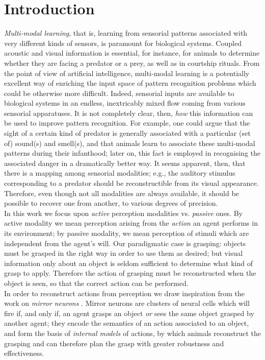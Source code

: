 \section{Introduction}
\label{sec:intro}

\emph{Multi-modal learning}, that is, learning from sensorial patterns associated with very different kinds of sensors, is paramount for biological systems. Coupled acoustic and visual information is essential, for instance, for animals to determine whether they are facing a predator or a prey, as well as in courtship rituals. From the point of view of artificial intelligence, multi-modal learning is a potentially excellent way of enriching the input space of pattern recognition problems which could be otherwise more difficult.
Indeed, sensorial inputs are available to biological systems in an endless, inextricably mixed flow coming from various sensorial apparatuses. It is not completely clear, then, \emph{how} this information can be used to improve pattern recognition. For example, one could argue that the sight of a certain kind of predator is generally associated with a particular (set of) sound(s) and smell(s), and that animals learn to associate these multi-modal patterns during their infanthood; later on, this fact is employed in recognising the associated danger in a dramatically better way. It seems apparent, then, that there is a mapping among sensorial modalities; e.g., the auditory stimulus corresponding to a predator should be reconstructible from its visual appearance. Therefore, even though not all modalities are always available, it should be possible to recover one from another, to various degrees of precision.\\
In this work we focus upon \emph{active} perception modalities vs. \emph{passive} ones. By active modality we mean perception arising from the \emph{action} an agent performs in its environment; by passive modality, we mean perception of stimuli which are independent from the agent's will. Our paradigmatic case is grasping: objects must be grasped in the right way in order to use them as desired; but visual information only about an object is seldom sufficient to determine what kind of grasp to apply. Therefore the action of grasping must be reconstructed when the object is seen, so that the correct action can be performed.\\
In order to reconstruct actions from perception we draw inspiration from the work on \emph{mirror neurons} \cite{gallese,rizz}. Mirror neurons are clusters of neural cells which will fire if, and only if, an agent grasps an object \emph{or} sees the same object grasped by another agent; they encode the semantics of an action associated to an object, and form the basis of \emph{internal models} of actions, by which animals reconstruct the grasping and can therefore plan the grasp with greater robustness and effectiveness.
